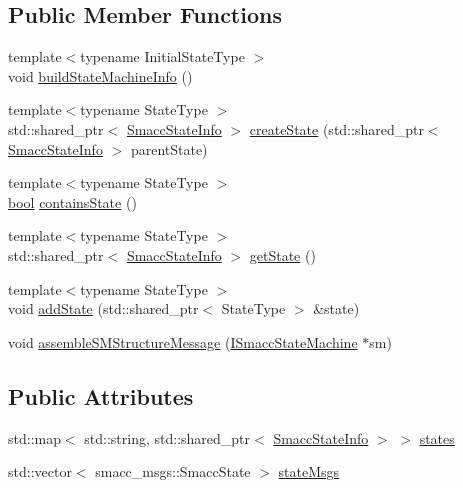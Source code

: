 \subsection*{Public Member Functions}
\begin{DoxyCompactItemize}
\item 
{\footnotesize template$<$typename Initial\+State\+Type $>$ }\\void \hyperlink{classsmacc_1_1introspection_1_1SmaccStateMachineInfo_a1482f3d6b3aff8a2702331bd3049987a}{build\+State\+Machine\+Info} ()
\item 
{\footnotesize template$<$typename State\+Type $>$ }\\std\+::shared\+\_\+ptr$<$ \hyperlink{classsmacc_1_1introspection_1_1SmaccStateInfo}{Smacc\+State\+Info} $>$ \hyperlink{classsmacc_1_1introspection_1_1SmaccStateMachineInfo_ad3eacdb32594e603fb36a8ab478d0ce7}{create\+State} (std\+::shared\+\_\+ptr$<$ \hyperlink{classsmacc_1_1introspection_1_1SmaccStateInfo}{Smacc\+State\+Info} $>$ parent\+State)
\item 
{\footnotesize template$<$typename State\+Type $>$ }\\\hyperlink{classbool}{bool} \hyperlink{classsmacc_1_1introspection_1_1SmaccStateMachineInfo_aa120497a9fc4cb4a05f6a27ff3be26cb}{contains\+State} ()
\item 
{\footnotesize template$<$typename State\+Type $>$ }\\std\+::shared\+\_\+ptr$<$ \hyperlink{classsmacc_1_1introspection_1_1SmaccStateInfo}{Smacc\+State\+Info} $>$ \hyperlink{classsmacc_1_1introspection_1_1SmaccStateMachineInfo_ab2970707b3eec89f70aba88612ab0ca5}{get\+State} ()
\item 
{\footnotesize template$<$typename State\+Type $>$ }\\void \hyperlink{classsmacc_1_1introspection_1_1SmaccStateMachineInfo_ab4eafccfbba21257405fc4274c2ed22a}{add\+State} (std\+::shared\+\_\+ptr$<$ State\+Type $>$ \&state)
\item 
void \hyperlink{classsmacc_1_1introspection_1_1SmaccStateMachineInfo_a6758065a8d1faaa7c3688cf0dffe9334}{assemble\+S\+M\+Structure\+Message} (\hyperlink{classsmacc_1_1ISmaccStateMachine}{I\+Smacc\+State\+Machine} $\ast$sm)
\end{DoxyCompactItemize}
\subsection*{Public Attributes}
\begin{DoxyCompactItemize}
\item 
std\+::map$<$ std\+::string, std\+::shared\+\_\+ptr$<$ \hyperlink{classsmacc_1_1introspection_1_1SmaccStateInfo}{Smacc\+State\+Info} $>$ $>$ \hyperlink{classsmacc_1_1introspection_1_1SmaccStateMachineInfo_aef31d74ad3669f0b0f57fe0e008cd2f8}{states}
\item 
std\+::vector$<$ smacc\+\_\+msgs\+::\+Smacc\+State $>$ \hyperlink{classsmacc_1_1introspection_1_1SmaccStateMachineInfo_a48e3ff7bbe2673d23e6942234446ebee}{state\+Msgs}
\end{DoxyCompactItemize}


